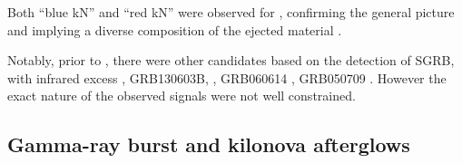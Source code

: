Both ``blue \ac{kN}'' and ``red \ac{kN}'' were observed for \GW{}, confirming the general 
picture and implying a diverse composition of the ejected material
\citep{Arcavi:2017xiz,Coulter:2017wya,Drout:2017ijr,Evans:2017mmy,Hallinan:2017woc,
    Kasliwal:2017ngb,Nicholl:2017ahq,Smartt:2017fuw,Soares-santos:2017lru,Tanvir:2017pws,
    Troja:2017nqp,Mooley:2018dlz,Ruan:2017bha,Lyman:2018qjg}.

%
% 
Notably, prior to \AT{}, there were other candidates based on the detection of \ac{SGRB}, 
with infrared excess \eg, 
GRB130603B, \citep{Berger:2013wna,Tanvir:2013pia}, 
GRB060614 \citep{Jin:2015txa,Yang:2015pha}, 
GRB050709 \citep{Jin:2016pnm}.
However the exact nature of the observed signals were not well constrained. 
%






\subsection{Gamma-ray burst and kilonova afterglows}\label{sec:intro:afterglow}

